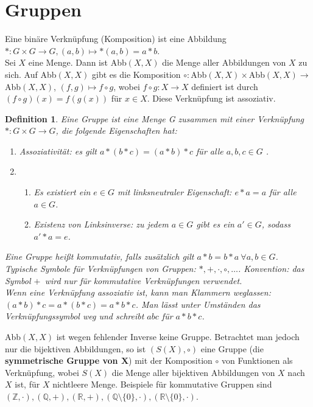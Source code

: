 \documentclass[12pt,a4paper]{article}
\theoremstyle{plain}
\newtheorem{Definition}[Theorem]{Definition}
\newcommand{\R}{\mathbb{R}}
\newcommand{\Z}{\mathbb{Z}}
\newcommand{\Q}{\mathbb{Q}}
\numberwithin{equation}{section}
\begin{document}
\section{Gruppen}
Eine binäre Verknüpfung (Komposition) ist eine Abbildung $*:G\times G \rightarrow G, (a,b)\mapsto *(a,b)=a*b$.\\
Sei $X$ eine Menge. Dann ist Abb$(X,X)$ die Menge aller Abbildungen von $X$ zu sich. Auf Abb$(X,X)$ gibt es die Komposition $\circ:$Abb$(X,X)\times$Abb$(X,X) \rightarrow $Abb$(X,X)$, $(f,g)\mapsto f\circ g$, wobei $f\circ g: X\rightarrow X$ definiert ist durch $(f\circ g)(x)=f(g(x))$ für $x\in X$. Diese Verknüpfung ist assoziativ.
\begin{Definition}
Eine Gruppe ist eine Menge G zusammen mit einer Verknüpfung $*:G\times G \rightarrow G$, die folgende Eigenschaften hat:
\begin{enumerate}
\renewcommand{\labelenumi}{\emph{(G\arabic{enumi})}}
\item Assoziativität: es gilt $a*(b*c)=(a*b)*c$ für alle $a,b,c\in G$ .
\item \begin{enumerate} \renewcommand{\labelenumi}{\emph{(\alph{enumi})}}
\item Es existiert ein $e\in G$ mit linksneutraler Eigenschaft: $e*a=a$ für alle $a\in G$.
\item Existenz von Linksinverse: zu jedem $a\in G$ gibt es ein $a'\in G$, sodass $a'*a=e$.
\end{enumerate}
\end{enumerate}
Eine Gruppe heißt kommutativ, falls zusätzlich gilt $a*b=b*a\ \forall a,b\in G$. Typische Symbole für Verknüpfungen von Gruppen: $*,+,\cdot,\circ,\ldots$. Konvention: das Symbol \glqq$+$\grqq\ wird nur für kommutative Verknüpfungen verwendet. \\
Wenn eine Verknüpfung assoziativ ist, kann man Klammern weglassen: $(a*b)*c=a*(b*c)=a*b*c$. Man lässt unter Umständen das Verknüpfungssymbol weg und schreibt $abc$ für $a*b*c$.
\end{Definition}
Abb$(X,X)$ ist wegen fehlender Inverse keine Gruppe. Betrachtet man jedoch nur die bijektiven Abbildungen, so ist $(S(X),\circ)$ eine Gruppe (die \textbf{symmetrische Gruppe von $\mathbf{X}$}) mit der Komposition $\circ$ von Funktionen als Verknüpfung, wobei $S(X)$ die Menge aller bijektiven Abbildungen von $X$ nach $X$ ist, für $X$ nichtleere Menge. Beispiele für kommutative Gruppen sind $(\Z,\cdot), (\Q,+), (\R,+), (\Q\setminus\{0\},\cdot),(\R\setminus\{0\},\cdot)$.
\end{document}
